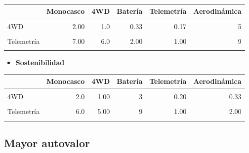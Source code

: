 \documentclass[
]{article}
\providecommand{\tightlist}{%
  \setlength{\itemsep}{0pt}\setlength{\parskip}{0pt}}
\begin{document}
\begin{longtable}[t]{lrrrrr}
\toprule
 & Monocasco & 4WD & Batería & Telemetría & Aerodinámica\\
\midrule
\cellcolor{gray!10}{Monocasco} & \cellcolor{gray!10}{1.00} & \cellcolor{gray!10}{0.5} & \cellcolor{gray!10}{0.20} & \cellcolor{gray!10}{0.14} & \cellcolor{gray!10}{3}\\
4WD & 2.00 & 1.0 & 0.33 & 0.17 & 5\\
\cellcolor{gray!10}{Batería} & \cellcolor{gray!10}{5.00} & \cellcolor{gray!10}{3.0} & \cellcolor{gray!10}{1.00} & \cellcolor{gray!10}{0.50} & \cellcolor{gray!10}{5}\\
Telemetría & 7.00 & 6.0 & 2.00 & 1.00 & 9\\
\cellcolor{gray!10}{Aerodinámica} & \cellcolor{gray!10}{0.33} & \cellcolor{gray!10}{0.2} & \cellcolor{gray!10}{0.20} & \cellcolor{gray!10}{0.11} & \cellcolor{gray!10}{1}\\
\bottomrule
\end{longtable}

\begin{itemize}
\tightlist
\item
  \textbf{Sostenibilidad}
\end{itemize}

\begin{longtable}[t]{lrrrrr}
\toprule
 & Monocasco & 4WD & Batería & Telemetría & Aerodinámica\\
\midrule
\cellcolor{gray!10}{Monocasco} & \cellcolor{gray!10}{1.0} & \cellcolor{gray!10}{0.50} & \cellcolor{gray!10}{2} & \cellcolor{gray!10}{0.17} & \cellcolor{gray!10}{0.33}\\
4WD & 2.0 & 1.00 & 3 & 0.20 & 0.33\\
\cellcolor{gray!10}{Batería} & \cellcolor{gray!10}{0.5} & \cellcolor{gray!10}{0.33} & \cellcolor{gray!10}{1} & \cellcolor{gray!10}{0.11} & \cellcolor{gray!10}{0.14}\\
Telemetría & 6.0 & 5.00 & 9 & 1.00 & 2.00\\
\cellcolor{gray!10}{Aerodinámica} & \cellcolor{gray!10}{3.0} & \cellcolor{gray!10}{3.00} & \cellcolor{gray!10}{7} & \cellcolor{gray!10}{0.50} & \cellcolor{gray!10}{1.00}\\
\bottomrule
\end{longtable}

\subsection{Mayor autovalor}\label{mayor-autovalor}
\end{document}
